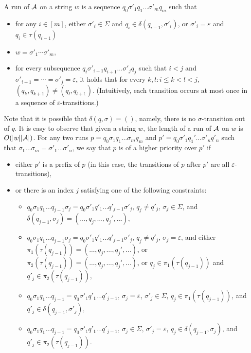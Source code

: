 A  run of $\mathcal{A}$ on a string $w$ is a sequence $q_0 \sigma'_1 q_1 \ldots \sigma'_m q_m$ such that 
\begin{itemize}
\item for any $i \in [m]$, either $\sigma'_i \in \Sigma$ and $q_i \in \delta (q_{i - 1}, \sigma'_i)$, or $\sigma'_i = \varepsilon$ and $q_i \in \tau(q_{i-1})$ %
\item $w = \sigma'_1 \cdots \sigma'_m$,
%
\item for every subsequence $q_i \sigma'_{i+1} q_{i+1} \ldots \sigma'_{j} q_j$ such that  $i < j$ and $\sigma'_{i+1} = \cdots = \sigma'_j = \varepsilon$, it holds that for every $k, l: i \le k < l < j$, $(q_k, q_{k+1}) \neq (q_l, q_{l+1})$.
(Intuitively, each transition occurs at most once in a sequence of $\varepsilon$-transitions.) 
\end{itemize}
Note that it is possible that $\delta(q, \sigma) = ()$, namely, there is no $\sigma$-transition out of $q$. 
It is easy to observe that given a string $w$, the length of a run of $\mathcal{A}$ on $w$ is $O(|w||\mathcal{A}|)$.
For any two runs $p = q_0 \sigma_1 q_1 \ldots \sigma_m q_m$ and $p' =  q_0 \sigma'_1 q_1' \ldots \sigma'_n q'_n$ such that $\sigma_1 \ldots \sigma_m = \sigma'_1 \ldots \sigma'_n$, we say that $p$ is of a higher priority over $p'$ if 
\begin{itemize}
\item either $p'$ is a prefix of $p$ (in this case, the transitions of $p$ after $p'$ are all $\varepsilon$-transitions), 
%
\item or there is an index $j$ satisfying one of the following constraints:
\begin{itemize}
\item $q_0 \sigma_1 q_1 \ldots q_{j-1} \sigma_j = q_0 \sigma'_1 q'_1 \ldots q'_{j-1} \sigma'_j$, $q_j \neq q'_j$, $\sigma_j \in \Sigma$, and $\delta (q_{j - 1}, \sigma_j) =(\ldots, q_j, \ldots, q_j', \ldots)$,
%
\item $q_0 \sigma_1 q_1 \ldots q_{j-1} \sigma_j = q_0 \sigma'_1 q'_1 \ldots q'_{j-1} \sigma'_j$, $q_j \neq q'_j$, $\sigma_j  = \varepsilon$,  and  either $\pi_1(\tau(q_{j - 1})) = (\ldots, q_j, \ldots, q_j', \ldots)$, or $\pi_2(\tau(q_{j - 1})) = (\ldots, q_j, \ldots, q_j', \ldots)$, or $q_j \in \pi_1(\tau(q_{j - 1}))$ and $q'_j \in \pi_2(\tau(q_{j-1}))$, 
%
\item $q_0 \sigma_1 q_1 \ldots q_{j-1}  = q_0 \sigma'_1 q'_1 \ldots q'_{j-1} $, $\sigma_j  = \varepsilon$, $\sigma'_j  \in \Sigma$, $q_j \in \pi_1(\tau(q_{j - 1}))$, and $q'_j \in \delta(q_{j-1}, \sigma'_j)$, 
%
\item $q_0 \sigma_1 q_1 \ldots q_{j-1}  = q_0 \sigma'_1 q'_1 \ldots q'_{j-1} $, $\sigma_j  \in \Sigma$, $\sigma'_j  = \varepsilon$, $q_j \in \delta(q_{j - 1}, \sigma_j)$, and $q'_j \in \pi_2(\tau(q_{j-1}))$.
\end{itemize}
\end{itemize}

